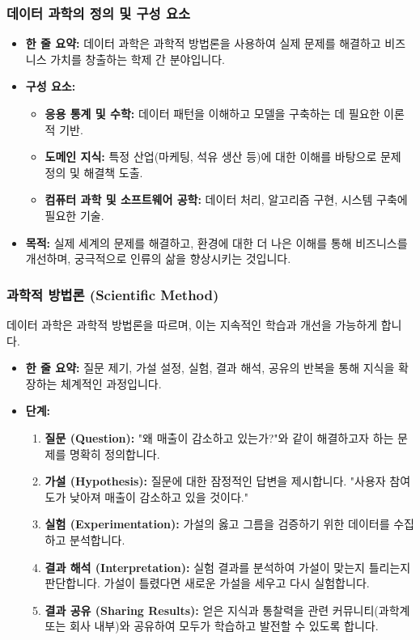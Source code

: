 \documentclass[11pt,a4paper]{article}
\begin{document}
\subsubsection*{데이터 과학의 정의 및 구성 요소}
\begin{itemize}
    \item \textbf{한 줄 요약:} 데이터 과학은 과학적 방법론을 사용하여 실제 문제를 해결하고 비즈니스 가치를 창출하는 학제 간 분야입니다.
    \item \textbf{구성 요소:}
    \begin{itemize}
        \item \textbf{응용 통계 및 수학:} 데이터 패턴을 이해하고 모델을 구축하는 데 필요한 이론적 기반.
        \item \textbf{도메인 지식:} 특정 산업(마케팅, 석유 생산 등)에 대한 이해를 바탕으로 문제 정의 및 해결책 도출.
        \item \textbf{컴퓨터 과학 및 소프트웨어 공학:} 데이터 처리, 알고리즘 구현, 시스템 구축에 필요한 기술.
    \end{itemize}
    \item \textbf{목적:} 실제 세계의 문제를 해결하고, 환경에 대한 더 나은 이해를 통해 비즈니스를 개선하며, 궁극적으로 인류의 삶을 향상시키는 것입니다.
\end{itemize}

\subsubsection*{과학적 방법론 (Scientific Method)}
데이터 과학은 과학적 방법론을 따르며, 이는 지속적인 학습과 개선을 가능하게 합니다.
\begin{itemize}
    \item \textbf{한 줄 요약:} 질문 제기, 가설 설정, 실험, 결과 해석, 공유의 반복을 통해 지식을 확장하는 체계적인 과정입니다.
    \item \textbf{단계:}
    \begin{enumerate}
        \item \textbf{질문 (Question):} "왜 매출이 감소하고 있는가?"와 같이 해결하고자 하는 문제를 명확히 정의합니다.
        \item \textbf{가설 (Hypothesis):} 질문에 대한 잠정적인 답변을 제시합니다. "사용자 참여도가 낮아져 매출이 감소하고 있을 것이다."
        \item \textbf{실험 (Experimentation):} 가설의 옳고 그름을 검증하기 위한 데이터를 수집하고 분석합니다.
        \item \textbf{결과 해석 (Interpretation):} 실험 결과를 분석하여 가설이 맞는지 틀리는지 판단합니다. 가설이 틀렸다면 새로운 가설을 세우고 다시 실험합니다.
        \item \textbf{결과 공유 (Sharing Results):} 얻은 지식과 통찰력을 관련 커뮤니티(과학계 또는 회사 내부)와 공유하여 모두가 학습하고 발전할 수 있도록 합니다.
    \end{enumerate}
\end{itemize}
\end{document}
